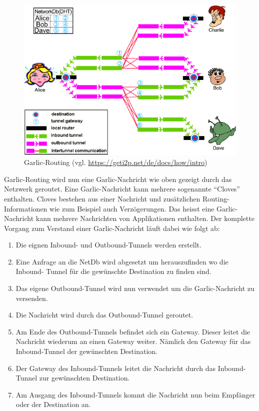 \begin{figure}[H]
    \includegraphics[width=\textwidth]{img/i2prouting.png}
    \caption{Garlic-Routing (vgl. \url{https://geti2p.net/de/docs/how/intro})}\label{fig:garlic_routing}
\end{figure}


Garlic-Routing wird nun eine Garlic-Nachricht wie oben gezeigt durch das Netzwerk geroutet.
Eine Garlic-Nachricht kann mehrere sogenannte ``Cloves'' enthalten.
Cloves bestehen aus einer Nachricht und zusätzlichen Routing-Informationen wie zum Beispiel auch Verzögerungen.
Das heisst eine Garlic-Nachricht kann mehrere Nachrichten von Applikationen enthalten.
Der komplette Vorgang zum Verstand einer Garlic-Nachricht läuft dabei wie folgt ab:

\begin{enumerate}
    \item Die eignen Inbound- und Outbound-Tunnels werden erstellt.
    \item Eine Anfrage an die NetDb wird abgesetzt um herauszufinden wo die Inbound- Tunnel für die gewünschte Destination zu finden sind.
    \item Das eigene Outbound-Tunnel wird nun verwendet um die Garlic-Nachricht zu versenden.
    \item Die Nachricht wird durch das Outbound-Tunnel geroutet.
    \item Am Ende des Outbound-Tunnels befindet sich ein Gateway. Dieser leitet die Nachricht wiederum an einen Gateway weiter. Nämlich den Gateway für das Inbound-Tunnel der gewünschten Destination.
    \item Der Gateway des Inbound-Tunnels leitet die Nachricht durch das Inbound-Tunnel zur gewünschten Destination.
    \item Am Ausgang des Inbound-Tunnels kommt die Nachricht nun beim Empfänger oder der Destination an.
\end{enumerate}

